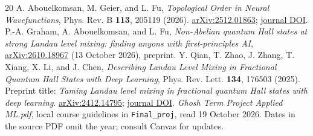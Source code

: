 \documentclass[11pt,letterpaper]{article}
\begin{document}
\begin{thebibliography}{20}
 A. Abouelkomsan, M. Geier, and L. Fu, \emph{Topological Order in Neural Wavefunctions}, Phys. Rev. B \textbf{113}, 205119 (2026). \href{https://arxiv.org/abs/2512.01863}{arXiv:2512.01863}; \href{https://doi.org/10.1103/bzq1-123h}{journal DOI}.
 P.-A. Graham, A. Abouelkomsan, and L. Fu, \emph{Non-Abelian quantum Hall states at strong Landau level mixing: finding anyons with first-principles AI}, \href{https://arxiv.org/abs/2610.18967}{arXiv:2610.18967} (13 October 2026), preprint.
 Y. Qian, T. Zhao, J. Zhang, T. Xiang, X. Li, and J. Chen, \emph{Describing Landau Level Mixing in Fractional Quantum Hall States with Deep Learning}, Phys. Rev. Lett. \textbf{134}, 176503 (2025). Preprint title: \emph{Taming Landau level mixing in fractional quantum Hall states with deep learning}. \href{https://arxiv.org/abs/2412.14795}{arXiv:2412.14795}; \href{https://doi.org/10.1103/PhysRevLett.134.176503}{journal DOI}.
 \emph{Ghosh Term Project Applied ML.pdf}, local course guidelines in \texttt{Final\_proj}, read 19 October 2026. Dates in the source PDF omit the year; consult Canvas for updates.
\end{thebibliography}
\end{document}
